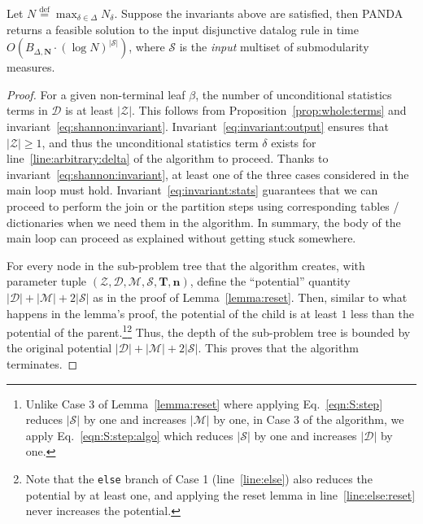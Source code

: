 \documentclass{theoretics}
\newcommand{\calM}{\mathcal M}
\newcommand{\calS}{\mathcal S}
\newcommand{\calD}{\mathcal D}
\newcommand{\calZ}{\mathcal Z}
\newcommand{\defeq}{\stackrel{\text{def}}{=}}
\newcommand{\panda}{\textsf{PANDA}\xspace}
\begin{document}
\begin{proposition}
Let $N \defeq \max_{\delta \in \Delta} N_\delta$.
Suppose the invariants above are satisfied, then \panda returns a feasible solution
to the input disjunctive datalog rule in time $O(B_{\Delta, \bm N} \cdot (\log N)^{|\calS|})$,
where $\calS$ is the {\em input} multiset of submodularity measures.
\label{prop:correctness}
\end{proposition}
\begin{proof}
  For a given non-terminal leaf $\beta$, the number of unconditional statistics terms
  in $\calD$ is at least $|\calZ|$. This follows from Proposition~\ref{prop:whole:terms}
  and invariant~\eqref{eq:shannon:invariant}. Invariant~\eqref{eq:invariant:output} ensures
  that $|\calZ| \geq 1$, and thus the unconditional statistics term $\delta$ exists
  for line~\ref{line:arbitrary:delta} of the algorithm to proceed.
  Thanks to invariant~\eqref{eq:shannon:invariant},
  at least one of the three cases considered in the main loop must hold.
  Invariant~\eqref{eq:invariant:stats} guarantees that we can proceed to perform the join
  or the partition steps using corresponding tables / dictionaries when we need them
  in the algorithm.
  In summary, the body of the main loop can proceed as explained without getting stuck
  somewhere.

  For every node in the sub-problem tree that the algorithm creates, with parameter tuple
  $(\calZ, \calD, \calM, \calS, \bm T, \bm n)$, define the ``potential'' quantity
  $|\calD|+|\calM|+2|\calS|$ as in the proof of Lemma~\ref{lemma:reset}.
  Then, similar to what happens in the lemma's proof, the potential of the child is at least
  $1$ less than the potential of the parent.\footnote{Unlike Case 3 of Lemma~\ref{lemma:reset}
  where applying Eq.~\eqref{eqn:S:step} reduces $|\calS|$ by one and increases $|\calM|$ by one,
  in Case 3 of the algorithm, we apply Eq.~\eqref{eqn:S:step:algo} which reduces $|\calS|$ by one and increases $|\calD|$ by one.}\footnote{Note that the {\tt else} branch of Case 1 (line~\ref{line:else}) also reduces the potential by at least one, and applying the reset lemma in line~\ref{line:else:reset} never increases the potential.} Thus, the depth of the sub-problem tree
  is bounded by the original potential $|\calD|+|\calM|+2|\calS|$.
  This proves that the algorithm terminates.


\end{proof}
\end{document}
